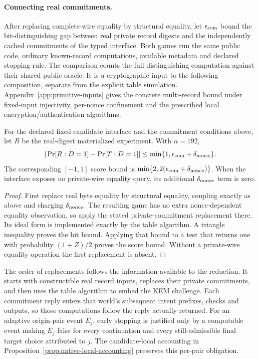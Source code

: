\paragraph{Connecting real commitments.}
After replacing complete-wire equality by structural equality, let
$\epsilon_{\rm com}$ bound the bit-distinguishing gap between real private
record digests and the independently cached commitments of the typed
interface. Both games run the same public code, ordinary known-record
computations, available metadata and declared stopping rule. The comparison
counts the full distinguishing computation against their shared public oracle.
It is a cryptographic input to the following composition, separate from the
explicit table simulation. Appendix~\ref{app:primitive-inputs} gives the
concrete multi-record bound under fixed-input injectivity, per-nonce
confinement and the prescribed local encryption/authentication algorithms.

\begin{corollary}
\label{cor:real-to-opaque}
For the declared fixed-candidate interface and the commitment conditions
above, let $R$ be the real-digest materialized experiment. With $n=192$,
\[
 |\Pr[R:D=1]-\Pr[T:D=1]|
 \leq\min\{1,\epsilon_{\rm com}+\delta_{\rm nonce}\}.
\]
The corresponding $[-1,1]$ score bound is
$\min\{2,2(\epsilon_{\rm com}+\delta_{\rm nonce})\}$.
When the interface exposes no private-wire equality query, its additional
$\delta_{\rm nonce}$ term is zero.
\end{corollary}
\begin{proof}
First replace real byte equality by structural equality, coupling exactly
as above and charging $\delta_{\rm nonce}$. The resulting game has no extra
nonce-dependent equality observation, so apply the stated private-commitment
replacement there. Its ideal form is implemented exactly by the table
algorithm. A triangle inequality proves the bit bound. Applying that bound
to a test that returns one with probability $(1+Z)/2$ proves the score bound.
Without a private-wire equality operation the first replacement is absent.
\end{proof}

The order of replacements follows the information available to the
reduction. It starts with constructible real record inputs, replaces their
private commitments, and then uses the table algorithm to embed the KEM
challenge. Each commitment reply enters that world's subsequent intent
prefixes, checks and outputs, so those computations follow the reply
actually returned. For an adaptive origin-pair
event $E_j$, early stopping is justified only by a computable event making
$E_j$ false for every continuation and every still-admissible final target
choice attributed to $j$. The candidate-local accounting in
Proposition~\ref{prop:native-local-accounting} preserves this per-pair
obligation.
